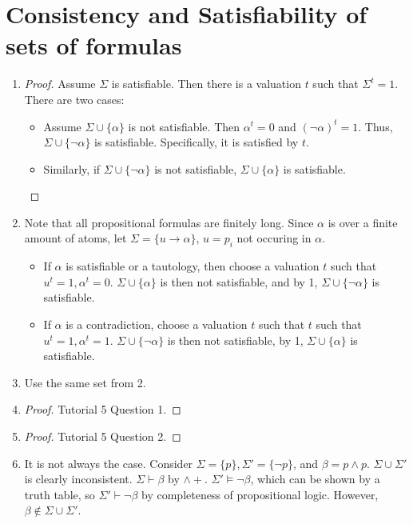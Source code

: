 \documentclass[12pt]{article}
\begin{document}
\section{Consistency and Satisfiability of sets of formulas}

\begin{enumerate}
    \item \begin{proof}
        Assume $\Sigma$ is satisfiable. Then there is a valuation $t$ such that $\Sigma^t=1$. There are two cases:
        \begin{itemize}
            \item Assume $\Sigma\cup\{\alpha\}$ is not satisfiable. Then $\alpha^t=0$ and $(\neg\alpha)^t=1$. Thus, $\Sigma\cup\{\neg\alpha\}$ is satisfiable. Specifically, it is satisfied by $t$.
            \item Similarly, if $\Sigma\cup\{\neg\alpha\}$ is not satisfiable, $\Sigma\cup\{\alpha\}$ is satisfiable.
        \end{itemize}
    \end{proof}
    \item Note that all propositional formulas are finitely long. Since $\alpha$ is over a finite amount of  atoms, let $\Sigma=\{u\to\alpha\}$, $u=p_i$ not occuring in $\alpha$.
    \begin{itemize}
        \item If $\alpha$ is satisfiable or a tautology, then choose a valuation $t$ such that $u^t=1, \alpha^t=0$. $\Sigma\cup\{\alpha\}$ is then not satisfiable, and by 1, $\Sigma\cup\{\neg\alpha\}$ is satisfiable.
        \item If $\alpha$ is a contradiction, choose a valuation $t$ such that $t$ such that $u^t=1, \alpha^t=1$. $\Sigma\cup\{\neg \alpha\}$ is then not satisfiable, by 1, $\Sigma\cup\{\alpha\}$ is satisfiable.
    \end{itemize}
    \item Use the same set from 2.
    \item \begin{proof}
        Tutorial 5 Question 1.
    \end{proof}
    \item \begin{proof}
        Tutorial 5 Question 2.
    \end{proof}
    \item It is not always the case. Consider $\Sigma=\{p\},\Sigma'=\{\neg p\}$, and $\beta=p\land p$. $\Sigma\cup\Sigma'$ is clearly inconsistent. $\Sigma\vdash\beta$ by $\land +$. $\Sigma'\models\neg\beta$, which can be shown by a truth table, so $\Sigma'\vdash\neg\beta$ by completeness of propositional logic. However, $\beta\notin\Sigma\cup\Sigma'$.

\end{enumerate}
\end{document}
